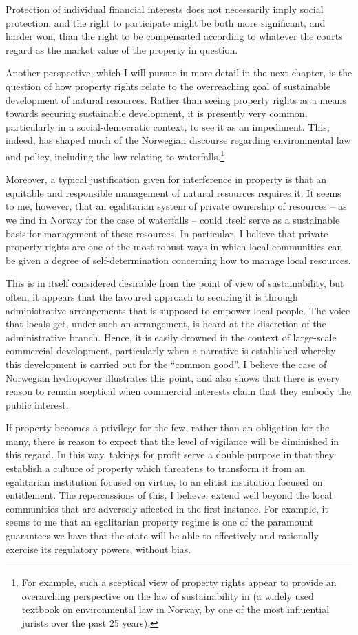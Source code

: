 Protection of individual financial interests does not necessarily imply social protection, and the right to participate might be both more significant, and harder won, than the right to be compensated according to whatever the courts regard as the market value of the property in question.

Another perspective, which I will pursue in more detail in the next chapter, is the question of how property rights relate to the overreaching goal of sustainable development of natural resources. Rather than seeing property rights as a means towards securing sustainable development, it is presently very common, particularly in a social-democratic context, to see it as an impediment. This, indeed, has shaped much of the Norwegian discourse regarding environmental law and policy, including the law relating to waterfalls.\footnote{For example, such a sceptical view of property rights appear to provide an overarching perspective on the law of sustainability in \cite{backer12} (a widely used textbook on environmental law in Norway, by one of the most influential jurists over the past 25 years).}

Moreover, a typical justification given for interference in property is that an equitable and responsible management of natural resources requires it. It seems to me, however, that an egalitarian system of private ownership of resources -- as we find in Norway for the case of waterfalls -- could itself serve as a sustainable basis for management of these resources. In particular, I believe that  private property rights are one of the most robust ways in which local communities can be given a degree of self-determination concerning how to manage local resources. 

This is in itself considered desirable from the point of view of sustainability, but often, it appears that the favoured approach to securing it is through administrative arrangements that is supposed to empower local people. The voice that locals get, under such an arrangement, is heard at the discretion of the administrative branch. Hence, it is easily drowned in the context of large-scale commercial development, particularly when a narrative is established whereby this development is carried out for the ``common good''. I believe the case of Norwegian hydropower illustrates this point, and also shows that there is every reason to remain sceptical when commercial interests claim that they embody the public interest.

If property becomes a privilege for the few, rather than an obligation for the many, there is reason to expect that the level of vigilance will be diminished in this regard. In this way, takings for profit serve a double purpose in that they establish a culture of property which threatens to transform it from an egalitarian institution focused on virtue, to an elitist institution focused on entitlement.
The repercussions of this, I believe, extend well beyond the local communities that are adversely affected in the first instance. For example, it seems to me that an egalitarian property regime is one of the paramount guarantees we have that the state will be able to effectively and rationally exercise its regulatory powers, without bias. 

